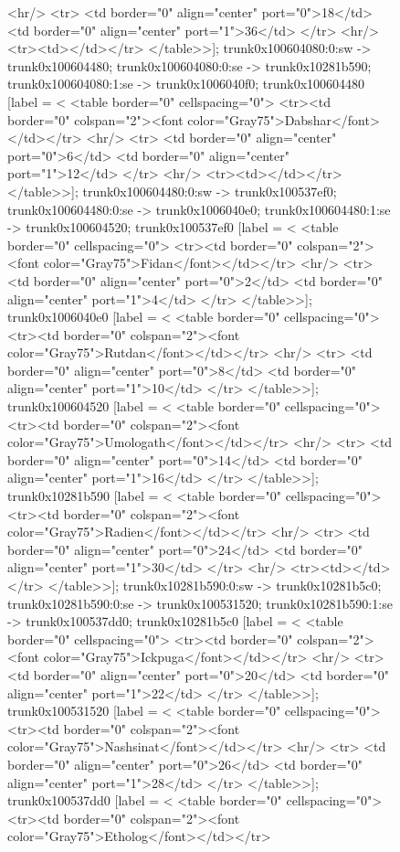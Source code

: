\documentclass[12pt]{article}
\begin{document}
\begin{figure}
{{	<hr/>
	<tr>
	<td border="0" align="center" port="0">18</td>
	<td border="0" align="center" port="1">36</td>
	</tr>
	<hr/>
	<tr><td></td></tr>
</table>>];
	trunk0x100604080:0:sw -> trunk0x100604480;
	trunk0x100604080:0:se -> trunk0x10281b590;
	trunk0x100604080:1:se -> trunk0x1006040f0;
	trunk0x100604480 [label = <
<table border="0" cellspacing="0">
	<tr><td border="0" colspan="2"><font color="Gray75">Dabshar</font></td></tr>
	<hr/>
	<tr>
	<td border="0" align="center" port="0">6</td>
	<td border="0" align="center" port="1">12</td>
	</tr>
	<hr/>
	<tr><td></td></tr>
</table>>];
	trunk0x100604480:0:sw -> trunk0x100537ef0;
	trunk0x100604480:0:se -> trunk0x1006040e0;
	trunk0x100604480:1:se -> trunk0x100604520;
	trunk0x100537ef0 [label = <
<table border="0" cellspacing="0">
	<tr><td border="0" colspan="2"><font color="Gray75">Fidan</font></td></tr>
	<hr/>
	<tr>
	<td border="0" align="center" port="0">2</td>
	<td border="0" align="center" port="1">4</td>
	</tr>
</table>>];
	trunk0x1006040e0 [label = <
<table border="0" cellspacing="0">
	<tr><td border="0" colspan="2"><font color="Gray75">Rutdan</font></td></tr>
	<hr/>
	<tr>
	<td border="0" align="center" port="0">8</td>
	<td border="0" align="center" port="1">10</td>
	</tr>
</table>>];
	trunk0x100604520 [label = <
<table border="0" cellspacing="0">
	<tr><td border="0" colspan="2"><font color="Gray75">Umologath</font></td></tr>
	<hr/>
	<tr>
	<td border="0" align="center" port="0">14</td>
	<td border="0" align="center" port="1">16</td>
	</tr>
</table>>];
	trunk0x10281b590 [label = <
<table border="0" cellspacing="0">
	<tr><td border="0" colspan="2"><font color="Gray75">Radien</font></td></tr>
	<hr/>
	<tr>
	<td border="0" align="center" port="0">24</td>
	<td border="0" align="center" port="1">30</td>
	</tr>
	<hr/>
	<tr><td></td></tr>
</table>>];
	trunk0x10281b590:0:sw -> trunk0x10281b5c0;
	trunk0x10281b590:0:se -> trunk0x100531520;
	trunk0x10281b590:1:se -> trunk0x100537dd0;
	trunk0x10281b5c0 [label = <
<table border="0" cellspacing="0">
	<tr><td border="0" colspan="2"><font color="Gray75">Ickpuga</font></td></tr>
	<hr/>
	<tr>
	<td border="0" align="center" port="0">20</td>
	<td border="0" align="center" port="1">22</td>
	</tr>
</table>>];
	trunk0x100531520 [label = <
<table border="0" cellspacing="0">
	<tr><td border="0" colspan="2"><font color="Gray75">Nashsinat</font></td></tr>
	<hr/>
	<tr>
	<td border="0" align="center" port="0">26</td>
	<td border="0" align="center" port="1">28</td>
	</tr>
</table>>];
	trunk0x100537dd0 [label = <
<table border="0" cellspacing="0">
	<tr><td border="0" colspan="2"><font color="Gray75">Etholog</font></td></tr>
}}
\end{figure}
\end{document}
